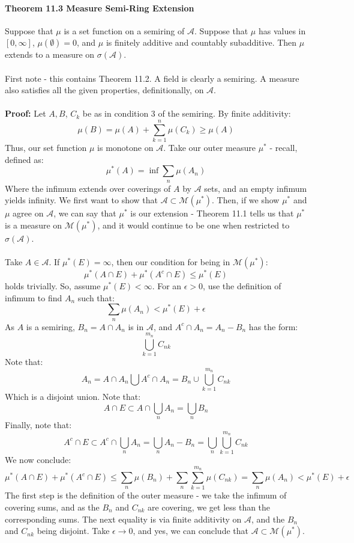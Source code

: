 \documentclass[12pt,a4paper]{article}
\newcommand{\1}[1]{\mathbbm{1}\left\{ #1 \right\}}
\newcommand{\acal}{\mathcal{A}}
\newcommand{\mcal}{\mathcal{M}}
\begin{document}
\paragraph{Theorem 11.3 Measure Semi-Ring Extension} Suppose that $\mu$ is a set function on a semiring of $\acal$. Suppose that $\mu$ has values in $[0,\infty]$, $\mu(\emptyset) = 0$, and $\mu$ is finitely additive and countably subadditive. Then $\mu$ extends to a measure on $\sigma(\acal)$.
\\\\
First note - this contains Theorem 11.2. A field is clearly a semiring. A measure also satisfies all the given properties, definitionally, on $\acal$.
\\\\
\textbf{Proof:} Let $A, B$, $C_k$ be as in condition 3 of the semiring. By finite additivity:
$$
	\mu(B) = \mu(A) + \sum_{k=1}^n \mu(C_k) \geq \mu(A)
$$
Thus, our set function $\mu$ is monotone on $\acal$. Take our outer measure $\mu^*$ - recall, defined as:
$$
	\mu^*(A) = \inf \sum_n \mu(A_n)
$$
Where the infimum extends over coverings of $A$ by $\acal$ sets, and an empty infimum yields infinity. We first want to show that $\acal \subset \mcal(\mu^*)$. Then, if we show $\mu^*$ and $\mu$ agree on $\acal$, we can say that $\mu^*$ is our extension - Theorem 11.1 tells us that $\mu^*$ is a measure on $\mcal(\mu^*)$, and it would continue to be one when restricted to $\sigma(\acal)$.
\\\\
Take $A \in \acal$. If $\mu^*(E) = \infty$, then our condition for being in $\mcal(\mu^*)$:
$$
	\mu^*(A \cap E) + \mu^*(A^c \cap E) \leq \mu^*(E)
$$
holds trivially. So, assume $\mu^*(E) < \infty$. For an $\epsilon > 0$, use the definition of infimum to find $A_n$ such that:
$$
	\sum_n \mu(A_n) < \mu^*(E) + \epsilon
$$
As $A$ is a semiring, $B_n = A \cap A_n$ is in $\acal$, and $A^c \cap A_n = A_n - B_n$ has the form:
$$
	\bigcup_{k=1}^{m_n} C_{nk}
$$
Note that:
$$
	A_n = A \cap A_n \bigcup A^c \cap A_n = B_n \cup \bigcup_{k=1}^{m_n} C_{nk}
$$
Which is a disjoint union. Note that:
$$
	A \cap E \subset A \cap \bigcup_n A_n = \bigcup_n B_n
$$
Finally, note that:
$$
	A^c \cap E \subset A^c \cap \bigcup_n A_n =
	\bigcup_n A_n - B_n =
	\bigcup_n \bigcup_{k=1}^{m_n} C_{nk}
$$
We now conclude:
$$
	\mu^*(A \cap E) + \mu^*(A^c \cap E) \leq
	\sum_n \mu(B_n) + \sum_n \sum_{k=1}^{m_n} \mu(C_{nk}) =
	\sum_n \mu(A_n) < \mu^*(E) + \epsilon
$$
The first step is the definition of the outer measure - we take the infimum of covering sums, and as the $B_n$ and $C_{nk}$ are covering, we get less than the corresponding sums. The next equality is via finite additivity on $\acal$, and the $B_n$ and $C_{nk}$ being disjoint. Take $\epsilon \to 0$, and yes, we can conclude that $\acal \subset \mcal(\mu^*)$.
\end{document}
